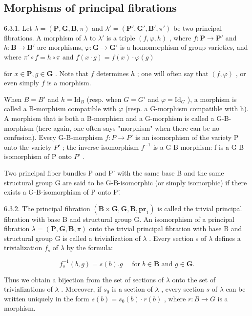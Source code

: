 \subsection{Morphisms of principal fibrations}

6.3.1. Let \(\lambda = (\mathbf{P}, \mathbf{G}, \mathbf{B}, \pi)\) and \(\lambda' = (\mathbf{P}', \mathbf{G}', \mathbf{B}', \pi')\) be two principal fibrations. A morphism of \(\lambda\) to \(\lambda'\) is a triple \((f, \varphi, h)\) , where \(f: \mathbf{P} \to \mathbf{P}'\) and \(h: \mathbf{B} \to \mathbf{B}'\) are morphisms, \(\varphi: \mathbf{G} \to \mathbf{G}'\) is a homomorphism of group varieties, and where \(\pi' \circ f = h \circ \pi\) and \(f(x \cdot g) = f(x) \cdot \varphi(g)\)

for \(x \in \mathbf{P}, g \in \mathbf{G}\) . Note that \(f\) determines \(h\) ; one will often say that \((f, \varphi)\) , or even simply \(f\) is a morphism.

When \(B = B'\) and \(h = \mathrm{Id}_{B}\) (resp. when \(G = G'\) and \(\varphi = \mathrm{Id}_{G}\) ), a morphism is called a B-morphism compatible with \(\varphi\) (resp. a G-morphism compatible with h). A morphism that is both a B-morphism and a G-morphism is called a G-B-morphism (here again, one often says "morphism" when there can be no confusion). Every G-B-morphism \(f : P \to P'\) is an isomorphism of the variety P onto the variety \(P'\) ; the inverse isomorphism \(f^{-1}\) is a G-B-morphism: f is a G-B-isomorphism of P onto \(P'\) .

Two principal fiber bundles P and P' with the same base B and the same structural group G are said to be G-B-isomorphic (or simply isomorphic) if there exists a G-B-isomorphism of P onto P'.

6.3.2. The principal fibration \((\mathbf{B} \times \mathbf{G}, \mathbf{G}, \mathbf{B}, \mathbf{pr}_{1})\) is called the trivial principal fibration with base B and structural group G. An isomorphism of a principal fibration \(\lambda = (\mathbf{P}, \mathbf{G}, \mathbf{B}, \pi)\) onto the trivial principal fibration with base B and structural group G is called a trivialization of \(\lambda\) . Every section s of \(\lambda\) defines a trivialization \(f_{s}\) of \(\lambda\) by the formula:

\[
f _ {s} ^ {- 1} (b, g) = s (b). g \quad \text {   for   } b \in \mathbf {B} \text {   and   } g \in \mathbf {G}.
\]

Thus we obtain a bijection from the set of sections of \(\lambda\) onto the set of trivializations of \(\lambda\) . Moreover, if \(s_0\) is a section of \(\lambda\) , every section \(s\) of \(\lambda\) can be written uniquely in the form \(s(b) = s_0(b) \cdot r(b)\) , where \(r: B \to G\) is a morphism.


